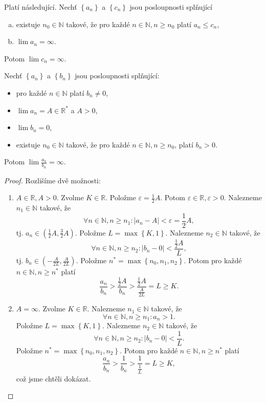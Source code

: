 \begin{poznamka}
	Platí následující. Nechť $\left \{ a_n \right \} $ a $\left \{ c_n \right \} $ jsou posloupnosti
	splňující
	\begin{enumerate}[(a)]
		\item existuje $n_0\in \mathbb N $ takové, že pro každé $n\in \mathbb N , n\geq n_0$ platí
		$a_n\leq c_n$,
		\item $\lim a_n=\infty$.
	\end{enumerate}
	Potom $\lim c_n = \infty$.
\end{poznamka}

\begin{veta}\label{veta2.12}
Nechť $\left \{ a_n \right \} $ a $\left \{ b_n \right \} $ jsou posloupnosti splňující:
\begin{itemize}
	\item pro každé $n \in \mathbb N $ platí $b_n \ne 0$,
	\item $\lim a_n = A\in \mathbb R ^*$ a $A>0$,
	\item $\lim b_n = 0$,
	\item existuje $n_0 \in \mathbb N $ takové, že pro každé $n \in \mathbb N , n \geq n_0$, platí $b_n > 0$.
\end{itemize}
Potom $\lim \frac{a_n}{b_n}=\infty$.
\end{veta}

\begin{proof}
	Rozlišíme dvě možnosti:
	\begin{enumerate}[(1)]
		\item $A\in \mathbb R , A>0$. Zvolme $K\in \mathbb R $. Položme $\varepsilon = \frac{1}{2}A$.
		Potom $\varepsilon \in \mathbb R , \varepsilon > 0$. Nalezneme $n_1 \in \mathbb N $ takové, že
		$$
		    \forall n\in \mathbb N , n \geq n_1: |a_n - A|< \varepsilon = \frac{1}{2}A,
		$$
		tj. $a_n \in \left( \frac{1}{2}A, \frac{3}{2}A \right ) $. Položme $L = \max \left \{ K,1 \right \} $.
		Nalezneme $n_2\in \mathbb N $ takové, že
		$$
		    \forall n \in \mathbb N , n \geq n_2: |b_n - 0| < \frac{\frac{1}{2}A}{L},
		$$
		tj. $b_n \in \left( -\frac{A}{2L}, \frac{A}{2L} \right ) $. Položme
		$n^* = \max \left \{ n_0, n_1, n_2 \right \} $. Potom pro každé $n\in \mathbb N , n \geq n^*$ platí
		$$
		\frac{a_n}{b_n}>\frac{\frac{1}{2}A}{b_n} > \frac{\frac{1}{2}A}{\frac{A}{2L}} = L \geq K.
		$$
		\item $A = \infty$. Zvolme $K\in \mathbb R $. Nalezneme $n_1\in \mathbb N $ takové, že
		$$
		    \forall n \in \mathbb N , n \geq n_1: a_n > 1.
		$$
		Položme $L = \max \left \{ K,1 \right \} $. Nalezneme  $n_2\in \mathbb N $ takové, že
		$$
		    \forall n \in \mathbb N , n \geq n_2: |b_n - 0| < \frac{1}{L}.
		$$
		Položme $n^* = \max \left \{ n_0, n_1, n_2 \right \} $. Potom pro každé $n \in \mathbb N , n \geq n^*$
		platí
		$$
            \frac{a_n}{b_n} > \frac{1}{b_n} > \frac{1}{\frac{1}{L}} = L \geq K,
		$$
		což jsme chtěli dokázat. \qedhere
	\end{enumerate}
\end{proof}

